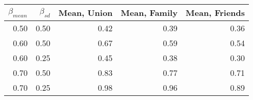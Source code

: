 \begin{tabular}{rrrrr}
\toprule
 $\beta_{mean}$ &  $\beta_{sd}$ &  Mean, Union &  Mean, Family &  Mean, Friends \\
\midrule
           0.50 &          0.50 &         0.42 &          0.39 &           0.36 \\
           0.60 &          0.50 &         0.67 &          0.59 &           0.54 \\
           0.60 &          0.25 &         0.45 &          0.38 &           0.30 \\
           0.70 &          0.50 &         0.83 &          0.77 &           0.71 \\
           0.70 &          0.25 &         0.98 &          0.96 &           0.89 \\
\bottomrule
\end{tabular}
